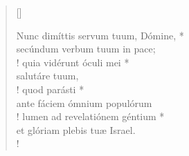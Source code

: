 

\vspace{0.3cm}

\def\greinitialformat#1{{\fontsize{40}{40}\selectfont #1}}
\gresetfirstlineaboveinitial{\small \textcolor{red}{}}{}
\setaboveinitialseparation{0.72mm}




\vspace{0.3cm}
\begin{verse}[\versewidth]
	


Nunc dimíttis servum tuum, Dómine, *\\
secúndum verbum tuum in pace;\\!
\vin quia vidérunt óculi mei *\\
\vin salutáre tuum,\\!
quod parásti *\\
ante fáciem ómnium populórum\\!
\vin lumen ad revelatiónem géntium *\\
et glóriam plebis tuæ Israel.\\!

\end{verse}
